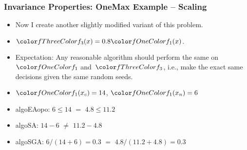 \documentclass[aspectratio=169,mathserif,notheorems]{beamer}%
\begin{document}
%
%
\begin{frame}%
\frametitle{Invariance Properties: OneMax Example -- Scaling}%
\parbox{0.415\paperwidth}{%
\begin{itemize}%
\item Now I create another slightly modified variant of this problem.%
\item<2-> $\fn{3}(x)=0.8\fn{1}(x)$.%
\item<3-> Expectation: Any reasonable algorithm should perform the same on~$\fn{1}$ and~$\fn{3}$, i.e., make the exact same decisions given the same random seeds.%
%
\item<5-> $\fn{1}(x_c)=14$, $\fn{1}(x_n)=6$%
%
\item<7-> \gls{algoEAopo}: $6\leq14$ \textcolor{greenYesColor}{$\mathbf{=}$} $4.8\leq11.2$ \greenYes%
%
\item<8-> \gls{algoSA}: $14-6$ \textcolor{redNoColor}{$\mathbf{\neq}$} $11.2-4.8$ \redNo%
%
\item<9-> \gls{algoSGA}: $6/(14+6)=0.3$ \textcolor{greenYesColor}{$\mathbf{=}$} $4.8/(11.2+4.8)=0.3$ \greenYes%
\end{itemize}%
}%
%
%
%
%
%
%
%
%
%
\end{frame}%
%
\end{document}
